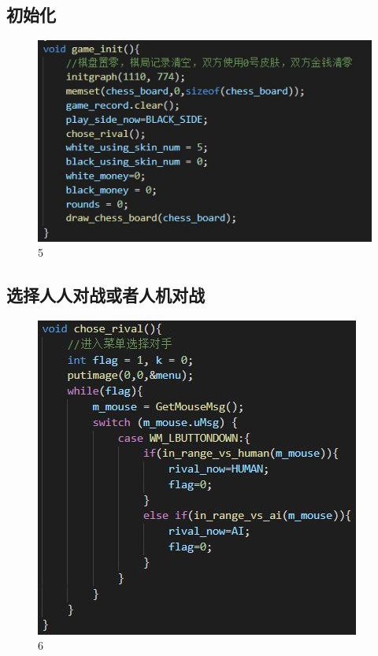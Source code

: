 \documentclass[UTF8]{ctexart}
\begin{document}
\subsection{初始化}
\begin{figure}[H]
    \centering
    \includegraphics[scale=1.0]{4.jpg}
\caption{5}
\end{figure}
\subsection{选择人人对战或者人机对战}
\begin{figure}[H]
    \centering
    \includegraphics[scale=1.0]{5.jpg}
\caption{6}
\end{figure}
\end{document}
